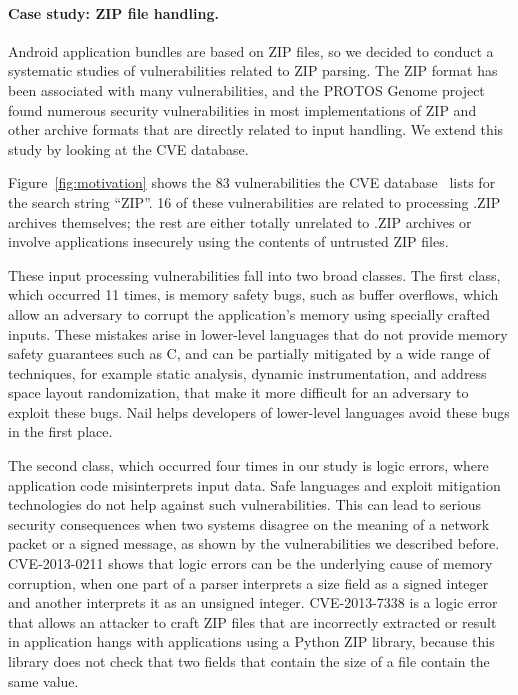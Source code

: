 \paragraph{Case study: ZIP file handling.}

Android application bundles are based on ZIP files, so we decided to conduct a systematic studies of
vulnerabilities related to ZIP parsing.  
The ZIP format has been associated with many vulnerabilities, and the
PROTOS Genome project~\cite{protos-c10-archive} found numerous security vulnerabilities in most
implementations of ZIP and other archive formats that are directly
related to input handling. We extend this study by looking at the CVE database.


Figure~\ref{fig:motivation} shows  the 83 vulnerabilities the CVE database~\cite{cve-database} lists
 for the search string ``ZIP''. 16 of these vulnerabilities are related to processing .ZIP archives
 themselves; the rest are either totally unrelated to .ZIP archives or involve applications insecurely using
 the contents of untrusted ZIP files.


These input processing vulnerabilities fall into two broad classes.  The first
class, which occurred 11 times, is memory safety bugs, such as buffer overflows, which allow an
adversary to corrupt the application's memory using specially crafted
inputs.  These mistakes arise in lower-level languages that do not
provide memory safety guarantees such as C, and can be partially
mitigated by a wide range of techniques, for example static analysis,
dynamic instrumentation, and address space layout randomization, that
make it more difficult for an adversary to exploit these bugs.
Nail helps developers of lower-level languages avoid these bugs
in the first place.

The second class, which occurred four times in our study is logic errors, where application code
misinterprets input data. Safe languages and exploit mitigation technologies do not help against
such vulnerabilities. This can lead to serious security consequences when two systems disagree on
the meaning of a network packet or a signed message, as shown by the vulnerabilities we described
before. CVE-2013-0211 shows that logic errors can be the underlying cause of memory corruption, when
one part of a parser interprets a size field as a signed integer and another interprets it as an
unsigned integer. CVE-2013-7338 is a logic error that allows an attacker to craft ZIP files that are
incorrectly extracted or result in application hangs with applications using a Python ZIP library,
because this library does not check that two fields that contain the size of a file contain the same value.

